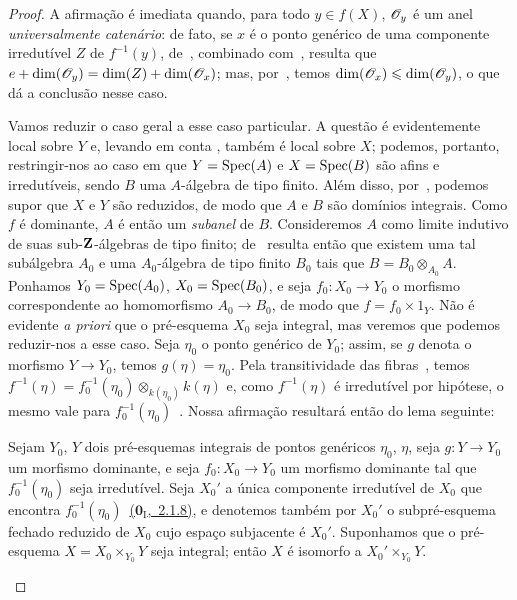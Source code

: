 \begin{proof}
A afirmação é imediata quando, para todo $y\in f(X)$, $\mathscr{O}_y$ é um
anel \emph{universalmente catenário}: de fato, se $x$ é o ponto genérico
de uma componente irredutível $Z$ de $f^{-1}(y)$, de~,
combinado com~, resulta que
$e+\dim(\mathscr{O}_y)=\dim(Z)+\dim(\mathscr{O}_x)$; mas, por~,
temos $\dim(\mathscr{O}_x)\leqslant\dim(\mathscr{O}_y)$, o que dá a conclusão nesse caso.

Vamos reduzir o caso geral a esse caso particular.
A questão é evidentemente local sobre $Y$ e, levando em conta
, também é local sobre $X$; podemos, portanto, restringir-nos
ao caso em que $Y=\operatorname{Spec}(A)$ e $X=\operatorname{Spec}(B)$ são afins e irredutíveis,
sendo $B$ uma $A$-álgebra de tipo finito.
Além disso, por~, podemos supor que $X$ e $Y$ são reduzidos,
de modo que $A$ e $B$ são domínios integrais.
Como $f$ é dominante, $A$ é então um \emph{subanel} de $B$.
Consideremos $A$ como limite indutivo de suas sub-$\mathbf{Z}$-álgebras
de tipo finito; de~ resulta então que existem uma tal
subálgebra $A_0$ e uma $A_0$-álgebra de tipo finito $B_0$ tais que
$B=B_0\otimes_{A_0}A$.
Ponhamos $Y_0=\operatorname{Spec}(A_0)$, $X_0=\operatorname{Spec}(B_0)$, e seja $f_0:X_0\to Y_0$
o morfismo correspondente ao homomorfismo $A_0\to B_0$, de modo que
$f=f_0\times 1_Y$.
Não é evidente \emph{a priori} que o pré-esquema $X_0$ seja integral,
mas veremos que podemos reduzir-nos a esse caso.
Seja $\eta_0$ o ponto genérico de $Y_0$; assim, se $g$ denota o morfismo
$Y\to Y_0$, temos $g(\eta)=\eta_0$.
Pela transitividade das fibras~, temos
$f^{-1}(\eta)=f_0^{-1}(\eta_0)\otimes_{k(\eta_0)}k(\eta)$ e, como
$f^{-1}(\eta)$ é irredutível por hipótese, o mesmo vale para
$f_0^{-1}(\eta_0)$~.
Nossa afirmação resultará então do lema seguinte:

\begin{lemma}[13.1.2]
\label{IV.13.1.2}
Sejam $Y_0$, $Y$ dois pré-esquemas integrais de pontos genéricos
$\eta_0$, $\eta$, seja $g:Y\to Y_0$ um morfismo dominante,
e seja $f_0:X_0\to Y_0$ um morfismo dominante tal que
$f_0^{-1}(\eta_0)$ seja irredutível.
Seja $X_0'$ a única componente irredutível de $X_0$ que encontra
$f_0^{-1}(\eta_0)$~\hyperref[0.2.1.8]{($\mathbf{0}_{\mathrm{I}}$,~2.1.8)},
e denotemos também por $X_0'$ o subpré-esquema fechado reduzido de $X_0$
cujo espaço subjacente é $X_0'$.
Suponhamos que o pré-esquema $X=X_0\times_{Y_0}Y$ seja integral;
então $X$ é isomorfo a $X_0'\times_{Y_0}Y$.
\end{lemma}


\end{proof}
